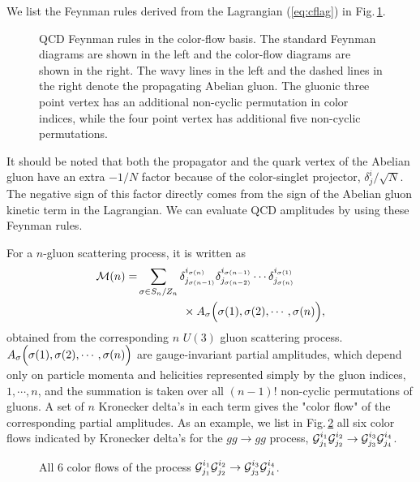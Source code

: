 We list the Feynman rules derived from the Lagrangian  (\ref{eq:cflag}) in
Fig.\,\ref{fig:diagrams}. 
\begin{figure}
\centering
{}
\caption{QCD Feynman rules in the color-flow basis. The standard
Feynman diagrams are shown in the left and the color-flow diagrams are
 shown in the right. The wavy lines in the left and the dashed lines in the right denote the propagating Abelian gluon. The
 gluonic three point vertex has an additional non-cyclic
 permutation in color indices, while the four point vertex has additional five non-cyclic permutations.}
\label{fig:diagrams}
\end{figure}
It should be noted that both the propagator and the quark vertex of the Abelian gluon have an extra
$-1/N$ factor because of the color-singlet projector, $\delta^i_j/\sqrt{N}$. The negative sign of this factor directly comes from the sign
of the Abelian gluon kinetic term in the Lagrangian. We can evaluate QCD amplitudes by using these Feynman rules.
 
 For a $n$-gluon scattering process, it is written as
\begin{align}
 {\cal M}(n)=&\sum_{\sigma\in S_n/Z_n}\delta^{i_{\sigma(n)}}_{j_{\sigma(n-1)}}
\delta^{i_{\sigma(n-1)}}_{j_{\sigma(n-2)}}\cdots\delta^{i_{\sigma(1)}}_{j_{\sigma(n)}}\nonumber\\
&\hspace{4em}\times A_{\sigma}\Bigl(\sigma(1),\sigma(2),\cdots,\sigma(n)\Bigr),
\label{eq:Mn}
\end{align}
obtained from the corresponding $n$ $U(3)$ gluon scattering process. $A_{\sigma}\Bigl(\sigma(1),\sigma(2),\cdots,\sigma(n)\Bigr)$ are
gauge-invariant partial
amplitudes, which depend only on particle momenta and
helicities represented simply by the gluon indices, $1,\cdots,n$, and
 the summation is taken over all $(n-1)!$ non-cyclic permutations of
gluons. A set of $n$ Kronecker delta's in each term gives the "color flow"
of the corresponding partial amplitudes. As an example, we list in Fig.\,\ref{fig:colorflows} all six color flows indicated by Kronecker delta's
for the  $gg\rightarrow gg$ process, ${\cal
G}_{j_1}^{i_1}{\cal G}_{j_2}^{i_2}\rightarrow{\cal G}_{j_3}^{i_3}{\cal
G}_{j_4}^{i_4}$.
\begin{figure}
\caption{All 6 color flows of the process ${\cal
G}_{j_1}^{i_1}{\cal G}_{j_2}^{i_2}\rightarrow{\cal G}_{j_3}^{i_3}{\cal
G}_{j_4}^{i_4}$.}
\label{fig:colorflows}
\end{figure}

